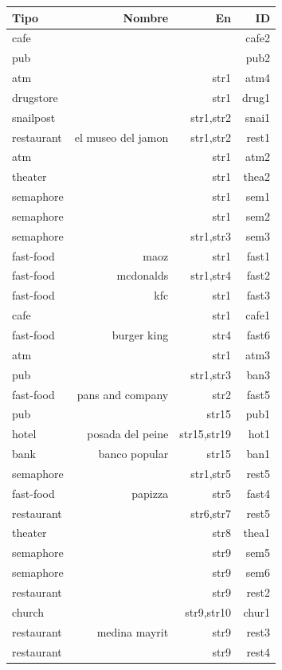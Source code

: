 \begin{table}[!t]
{\footnotesize
\begin{center}
\begin{tabular}{|l|r|r|r|}
\hline
Tipo & Nombre & En & ID\\
\hline

cafe & & & cafe2 \\
pub	& & & pub2 \\
atm	& & str1 & atm4 \\
drugstore & & str1 & drug1\\
snailpost & & str1,str2 & snai1\\
restaurant & el museo del jamon & str1,str2 & rest1\\
atm	& & str1 & atm2\\
theater & & str1 & thea2\\
semaphore & & str1 & sem1\\
semaphore & & str1 & sem2\\
semaphore & & str1,str3 & sem3\\
fast-food & maoz & str1 & fast1\\
fast-food & mcdonalds & str1,str4 & fast2\\
fast-food & kfc & str1 & fast3\\
cafe & & str1 & cafe1\\
fast-food & burger king & str4 & fast6\\
atm	& & str1 & atm3\\
pub	& & str1,str3 & ban3\\
fast-food & pans and company & str2 & fast5\\
pub	& & str15 & pub1\\
hotel & posada del peine & str15,str19 & hot1\\
bank & banco popular & str15 & ban1\\
semaphore & & str1,str5 & rest5\\
fast-food & papizza & str5 & fast4\\
restaurant	& & str6,str7 & rest5\\
theater	& & str8 & thea1\\
semaphore & & str9 & sem5\\
semaphore & & str9 & sem6\\
restaurant & & str9 & rest2\\
church	& & str9,str10 & chur1\\
restaurant & medina mayrit & str9 & rest3\\
restaurant & & str9 & rest4\\

\end{tabular}
\end{center}}
\end{table}
